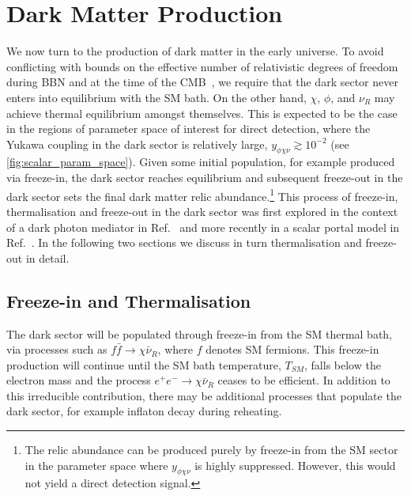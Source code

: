 \documentclass[aps, prd, reprint, nofootinbib, amsmath, amssymb, floatfix]{revtex4-2}
\begin{document}

\section{\label{sec:production}Dark Matter Production}

We now turn to the production of dark matter in the early universe. To avoid conflicting with bounds on the effective number of relativistic degrees of freedom during BBN and at the time of the CMB~\cite{Boehm:2013jpa}, we require that the dark sector never enters into equilibrium with the SM bath. On the other hand, $\chi$, $\phi$, and $\nu_R$ may achieve thermal equilibrium amongst themselves. This is expected to be the case in the regions of parameter space of interest for direct detection, where the Yukawa coupling in the dark sector is relatively large, $y_{\phi\chi\nu}\gtrsim10^{-2}$ (see \cref{fig:scalar_param_space}). Given some initial population, for example produced via freeze-in, the dark sector reaches equilibrium and subsequent freeze-out in the dark sector sets the final dark matter relic abundance.\footnote{The relic abundance can be produced purely by freeze-in from the SM sector in the parameter space where $y_{\phi\chi\nu}$ is highly suppressed. However, this would not yield a direct detection signal.} This process of freeze-in, thermalisation and freeze-out in the dark sector was first explored in the context of a dark photon mediator in Ref.~\cite{Chu:2011be} and more recently in a scalar portal model in Ref.~\cite{Krnjaic:2017tio}. In the following two sections we discuss in turn thermalisation and freeze-out in detail.



\subsection{Freeze-in and Thermalisation}\label{sec:production_FI}

The dark sector will be populated through freeze-in from the SM thermal bath, via processes such as $f\bar{f} \to \chi \bar{\nu}_R$, where $f$ denotes SM fermions. This freeze-in production will continue until the SM bath temperature, $T_{SM}$, falls below the electron mass and the process $e^+e^-\to\chi\bar{\nu}_R$ ceases to be efficient. In addition to this irreducible contribution, there may be additional processes that populate the dark sector, for example inflaton decay during reheating.
\end{document}
